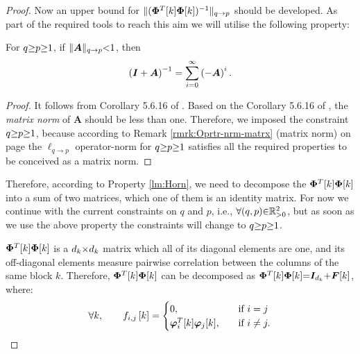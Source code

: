 \begin{proof}
{
\label{cmmnt:77} 
Now an upper bound for $\Vert (\boldsymbol{\Phi}^T[k] \boldsymbol{\Phi}[k])^{-1} \Vert_{q \to p}$ should be developed.
}
As part of the required tools to reach this aim we will utilise the following property:
\begin{property}
\label{lm:Horn} 
For $q {\geq} p {\geq} 1$, if $\Vert\boldsymbol{A} \Vert_{q \to p} {<} 1$, then \cite{HornR.A.2012}
\begin{gather*}
\left( \boldsymbol{I} + \boldsymbol{A} \right)^{-1} = \displaystyle\sum_{i=0}^\infty \left( -\boldsymbol{A} \right)^i.
\end{gather*}
\end{property}
\begin{proof}
It follows from Corollary 5.6.16 of \cite{HornR.A.2012}. 
Based on the Corollary 5.6.16 of \cite{HornR.A.2012}, the \emph{matrix norm} of $\boldsymbol{A}$ should be less than one.
Therefore, we imposed the constraint $q {\geq} p {\geq} 1$, because according to Remark \ref{rmrk:Oprtr-nrm-matrx} (matrix norm) on page \pageref{rmrk:Oprtr-nrm-matrx} the $\ell_{q {\to} p}$ operator-norm for $q {\geq} p {\geq} 1$ satisfies all the required properties to be conceived as a matrix norm. 
\end{proof}
Therefore, according to Property \ref{lm:Horn}, we need to decompose the $\boldsymbol{\Phi}^T[k] \boldsymbol{\Phi}[k]$ into a sum of two matrices, which one of them is an identity matrix.
For now we continue with the current constraints on $q$ and $p$, i.e., $\forall (q , p) {\in} \mathbb{R}^2_{{>} 0}$, but as soon as we use the above property the constraints will change to $q {\geq} p {\geq} 1$.

$\boldsymbol{\Phi}^T[k] \boldsymbol{\Phi}[k]$ is a $d_k {\times} d_k$ matrix which all of its diagonal elements are one, and its off-diagonal elements measure pairwise correlation between the columns of the same block $k$. 
Therefore, $\boldsymbol{\Phi}^T[k] \boldsymbol{\Phi}[k]$ can be decomposed as $\boldsymbol{\Phi}^T[k] \boldsymbol{\Phi}[k] {=} \boldsymbol{I}_{d_k} {+} \boldsymbol{F}[k] $, where:
\begin{equation*}
\forall k, \qquad \begin{aligned}
f_{i,j} \left[ k \right] = 
  \begin{cases}
    0,   \quad   &\text{if }i = j\\
    \boldsymbol{\varphi}_i^T[k] \boldsymbol{\varphi}_j[k],   \quad &\text{if }i \neq j.\\
  \end{cases} 
  \end{aligned}
\end{equation*} 


\end{proof}
